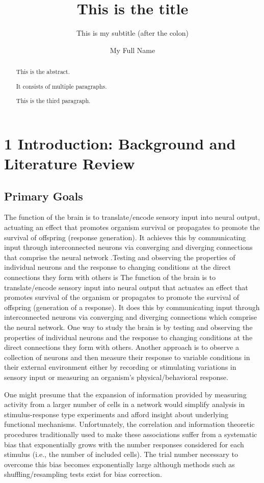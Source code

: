 \documentclass[
  12pt,
  lettersizepaper,
]{book}
\title{This is the title}
\subtitle{This is my subtitle (after the colon)}
\author{My Full Name}
\date{}
\begin{document}
\maketitle
\begin{abstract}
This is the abstract.

It consists of multiple paragraphs.

This is the third paragraph.
\end{abstract}

{
\setcounter{tocdepth}{2}
\tableofcontents
}
\listoftables
\listoffigures
\hypertarget{sec:introduction-background-and-literature-review}{%
\chapter{1 Introduction: Background and Literature
Review}\label{sec:introduction-background-and-literature-review}}

\hypertarget{sec:primary-goals}{%
\section{Primary Goals}\label{sec:primary-goals}}

The function of the brain is to translate/encode sensory input into
neural output, actuating an effect that promotes organism survival or
propagates to promote the survival of offspring (response generation).
It achieves this by communicating input through interconnected neurons
via converging and diverging connections that comprise the neural
network .Testing and observing the properties of individual neurons and
the response to changing conditions at the direct connections they form
with others is The function of the brain is to translate/encode sensory
input into neural output that actuates an effect that promotes survival
of the organism or propagates to promote the survival of offspring
(generation of a response). It does this by communicating input through
interconnected neurons via converging and diverging connections which
comprise the neural network. One way to study the brain is by testing
and observing the properties of individual neurons and the response to
changing conditions at the direct connections they form with others.
Another approach is to observe a collection of neurons and then measure
their response to variable conditions in their external environment
either by recording or stimulating variations in sensory input or
measuring an organism's physical/behavioral response.

One might presume that the expansion of information provided by
measuring activity from a larger number of cells in a network would
simplify analysis in stimulus-response type experiments and afford
insight about underlying functional mechanisms. Unfortunately, the
correlation and information theoretic procedures traditionally used to
make these associations suffer from a systematic bias that exponentially
grows with the number responses considered for each stimulus (i.e., the
number of included cells). The trial number necessary to overcome this
bias becomes exponentially large although methods such as
shuffling/resampling tests exist for bias correction.
\end{document}
